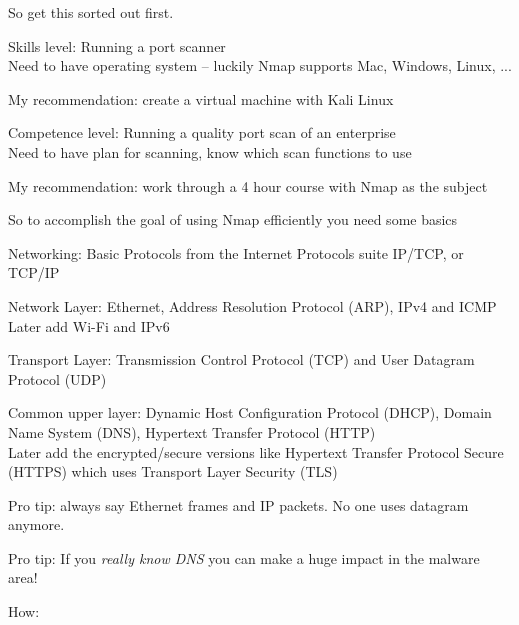 \documentclass[Screen16to9,17pt]{foils}
\begin{document}
So get this sorted out first.

\begin{list2}
\item Skills level: Running a port scanner\\
Need to have operating system -- luckily Nmap supports Mac, Windows, Linux, ...
\end{list2}

My recommendation: create a virtual machine with Kali Linux


\begin{list2}
\item Competence level: Running a quality port scan of an enterprise\\
Need to have plan for scanning, know which scan functions to use
\end{list2}
My recommendation: work through a 4 hour course with Nmap as the subject






So to accomplish the goal of using Nmap efficiently you need some basics

Networking: Basic Protocols from the Internet Protocols suite IP/TCP, or TCP/IP
\begin{list2}
\item Network Layer: Ethernet, Address Resolution Protocol (ARP), IPv4 and ICMP\\
Later add Wi-Fi and IPv6
\item Transport Layer: Transmission Control Protocol (TCP) and User Datagram Protocol (UDP)
\item Common upper layer: Dynamic Host Configuration Protocol (DHCP), Domain Name System (DNS),
Hypertext Transfer Protocol (HTTP)\\
Later add the encrypted/secure versions like Hypertext Transfer Protocol Secure (HTTPS) which uses Transport Layer Security (TLS)
\end{list2}

Pro tip: always say Ethernet frames and IP packets. No one uses datagram anymore.

Pro tip: If you \emph{really know DNS} you can make a huge impact in the malware area!




How:
\end{document}
